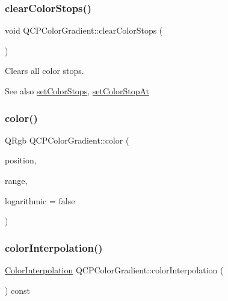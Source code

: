 \subsubsection{\texorpdfstring{clear\+Color\+Stops()}{clearColorStops()}}
{\footnotesize\ttfamily void Q\+C\+P\+Color\+Gradient\+::clear\+Color\+Stops (\begin{DoxyParamCaption}{ }\end{DoxyParamCaption})}

Clears all color stops.

\begin{DoxySeeAlso}{See also}
\hyperlink{class_q_c_p_color_gradient_a724e828aa6f0ba5011a9392477c35d3a}{set\+Color\+Stops}, \hyperlink{class_q_c_p_color_gradient_a3b48be5e78079db1bb2a1188a4c3390e}{set\+Color\+Stop\+At} 
\end{DoxySeeAlso}
\mbox{\label{class_q_c_p_color_gradient_a0599545c859268b025d2060dea741cea}} 
\subsubsection{\texorpdfstring{color()}{color()}}
{\footnotesize\ttfamily Q\+Rgb Q\+C\+P\+Color\+Gradient\+::color (\begin{DoxyParamCaption}\item[{double}]{position,  }\item[{const \hyperlink{class_q_c_p_range}{Q\+C\+P\+Range} \&}]{range,  }\item[{bool}]{logarithmic = {\ttfamily false} }\end{DoxyParamCaption})}

\mbox{\label{class_q_c_p_color_gradient_abad5002858db8cf75ecb045200881de6}} 
\subsubsection{\texorpdfstring{color\+Interpolation()}{colorInterpolation()}}
{\footnotesize\ttfamily \hyperlink{class_q_c_p_color_gradient_ac5dca17cc24336e6ca176610e7f77fc1}{Color\+Interpolation} Q\+C\+P\+Color\+Gradient\+::color\+Interpolation (\begin{DoxyParamCaption}{ }\end{DoxyParamCaption}) const\hspace{0.3cm}{\ttfamily [inline]}}

